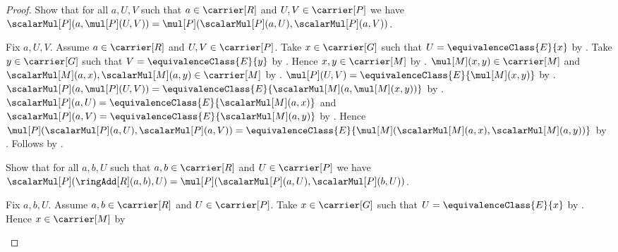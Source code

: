 \begin{proof}
    Show that for all $a,U,V$ such that
        $a\in\carrier[R]$ and $U,V\in\carrier[P]$ we have
        $\scalarMul[P](a,\mul[P](U,V))
            =\mul[P](\scalarMul[P](a,U),\scalarMul[P](a,V))$.
    \begin{subproof}
        Fix $a,U,V$.
        Assume $a\in\carrier[R]$ and $U,V\in\carrier[P]$.
        Take $x\in\carrier[G]$ such that
            $U=\equivalenceClass{E}{x}$ by
            .
        Take $y\in\carrier[G]$ such that
            $V=\equivalenceClass{E}{y}$ by
            .
        Hence $x,y\in\carrier[M]$ by
            .
        $\mul[M](x,y)\in\carrier[M]$ and
            $\scalarMul[M](a,x),\scalarMul[M](a,y)\in\carrier[M]$ by
            .
        $\mul[P](U,V)=\equivalenceClass{E}{\mul[M](x,y)}$ by
            .
        $\scalarMul[P](a,\mul[P](U,V))
            =\equivalenceClass{E}{
                \scalarMul[M](a,\mul[M](x,y))}$ by
            .
        $\scalarMul[P](a,U)=
            \equivalenceClass{E}{\scalarMul[M](a,x)}$ and
            $\scalarMul[P](a,V)=
            \equivalenceClass{E}{\scalarMul[M](a,y)}$ by
            .
        Hence
            $\mul[P](\scalarMul[P](a,U),\scalarMul[P](a,V))
                =\equivalenceClass{E}{
                    \mul[M](\scalarMul[M](a,x),
                            \scalarMul[M](a,y))}$ by
            .
        Follows by .
    \end{subproof}
    Show that for all $a,b,U$ such that
        $a,b\in\carrier[R]$ and $U\in\carrier[P]$ we have
        $\scalarMul[P](\ringAdd[R](a,b),U)
            =\mul[P](\scalarMul[P](a,U),\scalarMul[P](b,U))$.
    \begin{subproof}
        Fix $a,b,U$.
        Assume $a,b\in\carrier[R]$ and $U\in\carrier[P]$.
        Take $x\in\carrier[G]$ such that
            $U=\equivalenceClass{E}{x}$ by
            .
        Hence $x\in\carrier[M]$ by

\end{subproof}
\end{proof}
